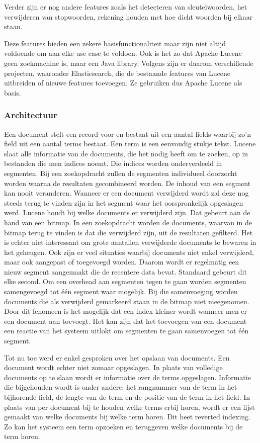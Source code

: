 Verder zijn er nog andere features zoals het detecteren van sleutelwoorden, het verwijderen van stopwoorden, rekening houden met hoe dicht woorden bij elkaar staan.

Deze features bieden een zekere basisfunctionaliteit maar zijn niet altijd voldoende om aan elke use case te voldoen. Ook is het zo dat Apache Lucene geen zoekmachine is, maar een Java library. Volgens \textcite{Whissel2009} zijn er daarom verschillende projecten, waaronder Elasticsearch, die de bestaande features van Lucene uitbreiden of nieuwe features toevoegen. Ze gebruiken dus Apache Lucene als basis.

\subsubsection{Architectuur}

Een document stelt een record voor en bestaat uit een aantal fields waarbij zo’n field uit een aantal terms bestaat. Een term is een eenvoudig stukje tekst. Lucene slaat alle informatie van de documents, die het nodig heeft om te zoeken, op in bestanden die men indices noemt. Die indices worden onderverdeeld in segmenten. Bij een zoekopdracht zullen de segmenten individueel doorzocht worden waarna de resultaten gecombineerd worden. De inhoud van een segment kan nooit veranderen. Wanneer er een document verwijderd wordt zal deze nog steeds terug te vinden zijn in het segment waar het oorspronkelijk opgeslagen werd. Lucene houdt bij welke documents er verwijderd zijn. Dat gebeurt aan de hand van een bitmap. In een zoekopdracht worden de documents, waarvan in de bitmap terug te vinden is dat die verwijderd zijn, uit de resultaten gefilterd. Het is echter niet interessant om grote aantallen verwijderde documents te bewaren in het geheugen. Ook zijn er veel situaties waarbij documents niet enkel verwijderd, maar ook aangepast of toegevoegd worden. Daarom wordt er regelmatig een nieuw segment aangemaakt die de recentere data bevat. Standaard gebeurt dit elke second. Om een overhead aan segmenten tegen te gaan worden segmenten samengevoegd tot één segment waar mogelijk. Bij die samenvoeging worden documents die als verwijderd gemarkeerd staan in de bitmap niet meegenomen. Door dit fenomeen is het mogelijk dat een index kleiner wordt wanneer men er een document aan toevoegt. Het kan zijn dat het toevoegen van een document een reactie van het systeem uitlokt om segmenten te gaan samenvoegen tot één segment. \autocite{Brasetvik2017}

Tot nu toe werd er enkel gesproken over het opslaan van documents. Een document wordt echter niet zomaar opgeslagen. In plaats van volledige documents op te slaan wordt er informatie over de terms opgeslagen. Informatie die bijgehouden wordt is onder andere: het rangnummer van de term in het bijhorende field, de lengte van de term en de positie van de term in het field. In plaats van per document bij te houden welke terms erbij horen, wordt er een lijst gemaakt van welke documents bij welke term horen. Dit heet reverted indexing. Zo kan het systeem een term opzoeken en teruggeven welke documents bij de term horen. \autocite{Whissel2009}

